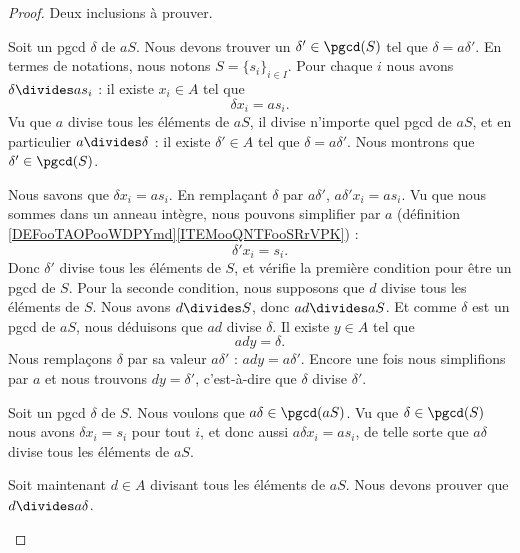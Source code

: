 \begin{proof}
	Deux inclusions à prouver.
	\begin{subproof}
		Soit un pgcd \( \delta\) de \( aS\). Nous devons trouver un \( \delta'\in\pgcd(S)\) tel que \( \delta=a\delta'\). En termes de notations, nous notons \( S=\{ s_i \}_{i\in I}\). Pour chaque \( i\) nous avons \( \delta\divides as_i\) : il existe \( x_i\in A\) tel que
		\begin{equation}
			\delta x_i=as_i.
		\end{equation}
		Vu que \( a\) divise tous les éléments de \( aS\), il divise n'importe quel pgcd de \( aS\), et en particulier \( a\divides \delta\) : il existe \( \delta'\in A\) tel que \( \delta=a\delta'\). Nous montrons que \( \delta'\in\pgcd(S)\).

		Nous savons que \( \delta x_i=as_i\). En remplaçant \( \delta\) par \( a\delta'\), \( a\delta'x_i=as_i\). Vu que nous sommes dans un anneau intègre, nous pouvons simplifier par \( a\) (définition \ref{DEFooTAOPooWDPYmd}\ref{ITEMooQNTFooSRrVPK}) :
		\begin{equation}
			\delta'x_i=s_i.
		\end{equation}
		Donc \( \delta'\) divise tous les éléments de \( S\), et vérifie la première condition pour être un pgcd de \( S\). Pour la seconde condition, nous supposons que \( d\) divise tous les éléments de \( S\). Nous avons \( d\divides S\), donc \( ad\divides aS\). Et comme \( \delta\) est un pgcd de \( aS\), nous déduisons que \( ad\) divise \( \delta\). Il existe \( y\in A\) tel que
		\begin{equation}
			ady=\delta.
		\end{equation}
		Nous remplaçons \( \delta\) par sa valeur \( a\delta'\) : \( ady=a\delta'\). Encore une fois nous simplifions par \( a\) et nous trouvons \( dy=\delta'\), c'est-à-dire que \( \delta\) divise \( \delta'\).


		Soit un pgcd \( \delta\) de \( S\). Nous voulons que \( a\delta\in \pgcd(aS)\). Vu que \( \delta\in\pgcd(S)\) nous avons \( \delta x_i=s_i\) pour tout \( i\), et donc aussi \( a\delta x_i=as_i\), de telle sorte que \( a\delta\) divise tous les éléments de \( aS\).

		Soit maintenant \( d\in A\) divisant tous les éléments de \( aS\). Nous devons prouver que \( d\divides a\delta\).


\end{subproof}
\end{proof}

